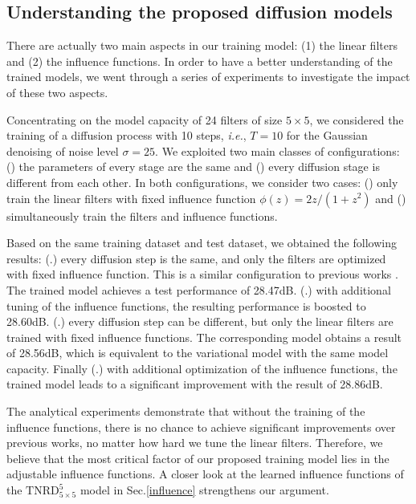 \documentclass[10pt,journal,compsoc]{IEEEtran}
\newcommand{\ie}{\emph{i.e.}}
\begin{document}
\subsection{Understanding the proposed diffusion models} 
There are actually two main aspects in 
our training model: (1) the linear filters and (2) the influence functions. In order to have a better understanding of the trained 
models, we went through a series of experiments to investigate the impact of these two aspects. 

Concentrating on the model capacity of 24 filters of size $5 \times 5$, 
we considered the training of a diffusion process with 10 steps, \ie, $T = 10$ for the Gaussian denoising of noise level $\sigma = 25$. 
We exploited two main classes of configurations: 
({\color{blue}{A}}) the parameters of every stage are the same and 
({\color{blue}{B}}) every diffusion stage is different from each other. In both configurations, 
we consider two cases: ({\color{blue}{I}}) only train the linear filters with fixed influence 
function $\phi(z) = 2z/(1+z^2)$ and ({\color{blue}{II}}) simultaneously 
train the filters and influence functions. 

Based on the same training dataset and test dataset, we obtained the following results: 
({\color{blue}{A}}.{\color{blue}{I}}) every diffusion step is the same, and only the filters are optimized with fixed influence 
function. This is a similar configuration to previous works \cite{Barbu2009, DomkeAISTATS2012}. 
The trained model achieves a test performance of 28.47dB. 
({\color{blue}{A}}.{\color{blue}{II}}) with additional tuning of the influence functions, the resulting performance  is boosted to 
28.60dB. ({\color{blue}{B}}.{\color{blue}{I}}) every diffusion step can be different, but only the linear filters are trained with fixed 
influence functions. The corresponding model obtains a result of 28.56dB, which is equivalent to 
the variational model \cite{ChenPRB13} with the same model capacity. Finally ({\color{blue}{B}}.{\color{blue}{II}}) 
with additional optimization of the influence functions, the trained model leads to a significant improvement with the result of 
28.86dB. 

The analytical experiments demonstrate that without the training of the influence functions, there is no chance to achieve 
significant improvements over previous works, 
no matter how hard we tune the linear filters. {Therefore, we believe that 
the most critical factor of our proposed training model lies in the adjustable 
influence functions.} 
A closer look at the learned influence functions of the 
$\text{TNRD}_{5 \times 5}^5$ model in Sec.\ref{influence} strengthens our argument. 
  
\end{document}
